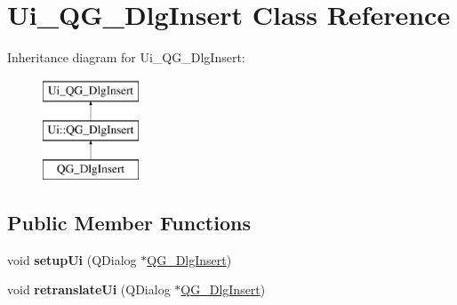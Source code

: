 \hypertarget{classUi__QG__DlgInsert}{\section{Ui\-\_\-\-Q\-G\-\_\-\-Dlg\-Insert Class Reference}
\label{classUi__QG__DlgInsert}
}
Inheritance diagram for Ui\-\_\-\-Q\-G\-\_\-\-Dlg\-Insert\-:\begin{figure}[H]
\begin{center}
\leavevmode
\includegraphics[height=3.000000cm]{classUi__QG__DlgInsert}
\end{center}
\end{figure}
\subsection*{Public Member Functions}
\begin{DoxyCompactItemize}
\item 
\hypertarget{classUi__QG__DlgInsert_ab4d5f305eb3c2c392d62176c18fd341e}{void {\bfseries setup\-Ui} (Q\-Dialog $\ast$\hyperlink{classQG__DlgInsert}{Q\-G\-\_\-\-Dlg\-Insert})}\label{classUi__QG__DlgInsert_ab4d5f305eb3c2c392d62176c18fd341e}

\item 
\hypertarget{classUi__QG__DlgInsert_aec7cbc9f072ea9d53afbd091c938be0e}{void {\bfseries retranslate\-Ui} (Q\-Dialog $\ast$\hyperlink{classQG__DlgInsert}{Q\-G\-\_\-\-Dlg\-Insert})}\label{classUi__QG__DlgInsert_aec7cbc9f072ea9d53afbd091c938be0e}

\end{DoxyCompactItemize}
